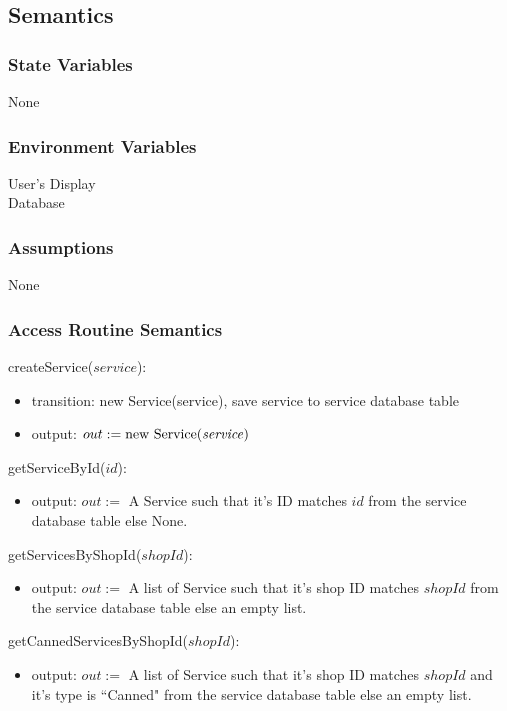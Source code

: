 \documentclass[12pt, titlepage]{article}
\begin{document}
\subsection{Semantics}

\subsubsection{State Variables}

None

\subsubsection{Environment Variables}

User's Display \\ Database

\subsubsection{Assumptions}

None

\subsubsection{Access Routine Semantics}

\noindent createService($service$):
\begin{itemize}
	\item transition: new Service(service), save service to service database table
	\item output: $out := \text{new Service(\emph{service})}$
\end{itemize}

\noindent getServiceById($id$):
\begin{itemize}
	\item output: $out :=$ A Service such that it's ID matches $id$ from the service database table else
	      None.
\end{itemize}

\noindent getServicesByShopId($shopId$):
\begin{itemize}
	\item output: $out :=$ A list of Service such that it's shop ID matches $shopId$ from the service
	      database table else an empty list.
\end{itemize}

\noindent getCannedServicesByShopId($shopId$):
\begin{itemize}
	\item output: $out :=$ A list of Service such that it's shop ID matches $shopId$ and it's type is
	      ``Canned" from the service database table else an empty list.
\end{itemize}
\end{document}
